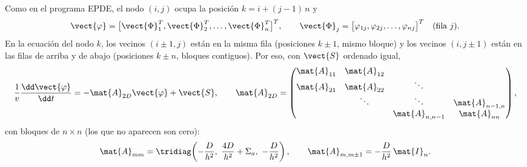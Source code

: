 Como en el programa EPDE, el nodo $(i, j)$ ocupa la posición $k = i + (j-1)\,n$ y
\[
  \vect{\varphi} = \big[\vect{\Phi}_1^T, \vect{\Phi}_2^T, \dots, \vect{\Phi}_n^T\big]^T,
  \qquad
  \vect{\Phi}_j = \big[\varphi_{1j}, \varphi_{2j}, \dots, \varphi_{nj}\big]^T \quad (\text{fila } j).
\]
En la ecuación del nodo $k$, los vecinos $(i\pm1, j)$ están en la misma fila (posiciones $k\pm1$, mismo
bloque) y los vecinos $(i, j\pm1)$ están en las filas de arriba y de abajo (posiciones $k\pm n$, bloques
contiguos). Por eso, con $\vect{S}$ ordenado igual,
\[
  \frac1v\frac{\dd\vect{\varphi}}{\dd t} = -\mat{A}_{2D}\vect{\varphi} + \vect{S},
  \qquad
  \mat{A}_{2D} =
  \begin{pmatrix}
    \mat{A}_{11} & \mat{A}_{12} &              &              \\
    \mat{A}_{21} & \mat{A}_{22} & \ddots       &              \\
                 & \ddots       & \ddots       & \mat{A}_{n-1,n}\\
                 &              & \mat{A}_{n,n-1} & \mat{A}_{nn}
  \end{pmatrix},
\]
con bloques de $n\times n$ (los que no aparecen son cero):
\[
  \mat{A}_{mm} = \tridiag\!\left(-\frac{D}{h^2},\ \frac{4D}{h^2} + \Sigma_a,\ -\frac{D}{h^2}\right),
  \qquad
  \mat{A}_{m,m\pm1} = -\frac{D}{h^2}\,\mat{I}_n .
\]

